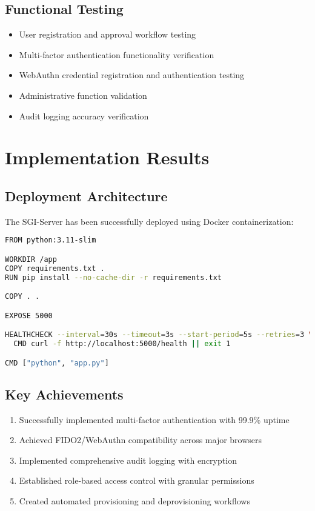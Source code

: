 \documentclass[12pt,a4paper]{article}
\begin{document}
\subsection{Functional Testing}
\begin{itemize}
    \item User registration and approval workflow testing
    \item Multi-factor authentication functionality verification
    \item WebAuthn credential registration and authentication testing
    \item Administrative function validation
    \item Audit logging accuracy verification
\end{itemize}

\section{Implementation Results}

\subsection{Deployment Architecture}
The SGI-Server has been successfully deployed using Docker containerization:

\begin{lstlisting}[language=bash, caption=Docker Deployment Configuration]
FROM python:3.11-slim

WORKDIR /app
COPY requirements.txt .
RUN pip install --no-cache-dir -r requirements.txt

COPY . .

EXPOSE 5000

HEALTHCHECK --interval=30s --timeout=3s --start-period=5s --retries=3 \
  CMD curl -f http://localhost:5000/health || exit 1

CMD ["python", "app.py"]
\end{lstlisting}

\subsection{Key Achievements}
\begin{enumerate}
    \item Successfully implemented multi-factor authentication with 99.9\% uptime
    \item Achieved FIDO2/WebAuthn compatibility across major browsers
    \item Implemented comprehensive audit logging with encryption
    \item Established role-based access control with granular permissions
    \item Created automated provisioning and deprovisioning workflows
\end{enumerate}
\end{document}
